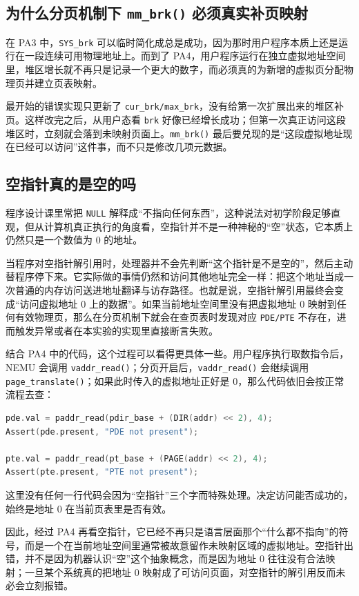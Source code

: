 \documentclass[a4paper]{article}
\begin{document}
\subsection{为什么分页机制下 \texttt{mm\_brk()} 必须真实补页映射}
在 PA3 中，\texttt{SYS\_brk} 可以临时简化成总是成功，因为那时用户程序本质上还是运行在一段连续可用物理地址上。而到了 PA4，用户程序运行在独立虚拟地址空间里，堆区增长就不再只是记录一个更大的数字，而必须真的为新增的虚拟页分配物理页并建立页表映射。

最开始的错误实现只更新了 \texttt{cur\_brk/max\_brk}，没有给第一次扩展出来的堆区补页。这样改完之后，从用户态看 \texttt{brk} 好像已经增长成功；但第一次真正访问这段堆区时，立刻就会落到未映射页面上。\texttt{mm\_brk()} 最后要兑现的是“这段虚拟地址现在已经可以访问”这件事，而不只是修改几项元数据。

\subsection{空指针真的是空的吗}
程序设计课里常把 \texttt{NULL} 解释成“不指向任何东西”，这种说法对初学阶段足够直观，但从计算机真正执行的角度看，空指针并不是一种神秘的“空”状态，它本质上仍然只是一个数值为 0 的地址。

当程序对空指针解引用时，处理器并不会先判断“这个指针是不是空的”，然后主动替程序停下来。它实际做的事情仍然和访问其他地址完全一样：把这个地址当成一次普通的内存访问送进地址翻译与访存路径。也就是说，空指针解引用最终会变成“访问虚拟地址 0 上的数据”。如果当前地址空间里没有把虚拟地址 0 映射到任何有效物理页，那么在分页机制下就会在查页表时发现对应 \texttt{PDE/PTE} 不存在，进而触发异常或者在本实验的实现里直接断言失败。

结合 PA4 中的代码，这个过程可以看得更具体一些。用户程序执行取数指令后，NEMU 会调用 \texttt{vaddr\_read()}；分页开启后，\texttt{vaddr\_read()} 会继续调用 \texttt{page\_translate()}；如果此时传入的虚拟地址正好是 0，那么代码依旧会按正常流程去查：
\begin{lstlisting}[language=C]
pde.val = paddr_read(pdir_base + (DIR(addr) << 2), 4);
Assert(pde.present, "PDE not present");

pte.val = paddr_read(pt_base + (PAGE(addr) << 2), 4);
Assert(pte.present, "PTE not present");
\end{lstlisting}
这里没有任何一行代码会因为“空指针”三个字而特殊处理。决定访问能否成功的，始终是地址 0 在当前页表里是否有效。

因此，经过 PA4 再看空指针，它已经不再只是语言层面那个“什么都不指向”的符号，而是一个在当前地址空间里通常被故意留作未映射区域的虚拟地址。空指针出错，并不是因为机器认识“空”这个抽象概念，而是因为地址 0 往往没有合法映射；一旦某个系统真的把地址 0 映射成了可访问页面，对空指针的解引用反而未必会立刻报错。
\end{document}
